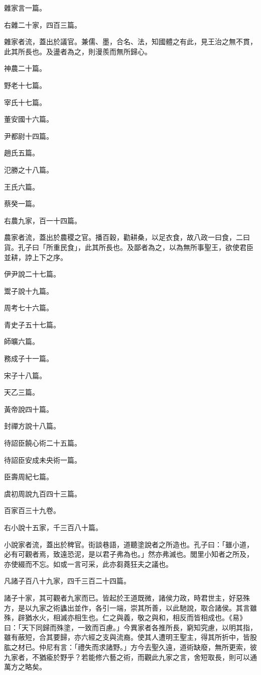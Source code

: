 \begin{pinyinscope}
雜家言一篇。

右雜二十家，四百三篇。

雜家者流，蓋出於議官。兼儒、墨，合名、法，知國體之有此，見王治之無不貫，此其所長也。及盪者為之，則漫羨而無所歸心。

神農二十篇。

野老十七篇。

宰氏十七篇。

董安國十六篇。

尹都尉十四篇。

趙氏五篇。

氾勝之十八篇。

王氏六篇。

蔡癸一篇。

右農九家，百一十四篇。

農家者流，蓋出於農稷之官。播百穀，勸耕桑，以足衣食，故八政一曰食，二曰貨。孔子曰「所重民食」，此其所長也。及鄙者為之，以為無所事聖王，欲使君臣並耕，誖上下之序。

伊尹說二十七篇。

鬻子說十九篇。

周考七十六篇。

青史子五十七篇。

師曠六篇。

務成子十一篇。

宋子十八篇。

天乙三篇。

黃帝說四十篇。

封禪方說十八篇。

待詔臣饒心術二十五篇。

待詔臣安成未央術一篇。

臣壽周紀七篇。

虞初周說九百四十三篇。

百家百三十九卷。

右小說十五家，千三百八十篇。

小說家者流，蓋出於稗官。街談巷語，道聽塗說者之所造也。孔子曰：「雖小道，必有可觀者焉，致遠恐泥，是以君子弗為也。」然亦弗滅也。閭里小知者之所及，亦使綴而不忘。如或一言可采，此亦芻蕘狂夫之議也。

凡諸子百八十九家，四千三百二十四篇。

諸子十家，其可觀者九家而已。皆起於王道既微，諸侯力政，時君世主，好惡殊方，是以九家之術蠭出並作，各引一端，崇其所善，以此馳說，取合諸侯。其言雖殊，辟猶水火，相滅亦相生也。仁之與義，敬之與和，相反而皆相成也。《易》曰：「天下同歸而殊塗，一致而百慮。」今異家者各推所長，窮知究慮，以明其指，雖有蔽短，合其要歸，亦六經之支與流裔。使其人遭明王聖主，得其所折中，皆股肱之材已。仲尼有言：「禮失而求諸野。」方今去聖久遠，道術缺廢，無所更索，彼九家者，不猶瘉於野乎？若能修六藝之術，而觀此九家之言，舍短取長，則可以通萬方之略矣。


\end{pinyinscope}
